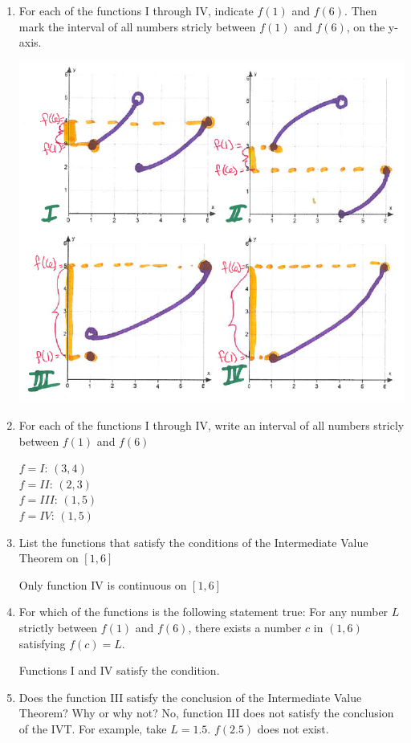 \documentclass[nooutcomes]{ximera}
\begin{document}
\begin{problem}
\begin{enumerate}
\begin{enumerate}
	\item For each of the functions I through IV, indicate $f(1)$ and $f(6)$.  Then mark the interval of all numbers stricly between $f(1)$ and $f(6)$, on the y-axis.
	\begin{image}
	\includegraphics[scale=.6]{Figure4.png}
	\end{image}


	\item For each of the functions I through IV, write an interval of all numbers stricly between $f(1)$ and $f(6)$
		\begin{freeResponse}
		$f=I$: $(3,4)$\\
		$f=II$: $(2,3)$\\
		$f=III$: $(1,5)$\\
		$f=IV$: $(1,5)$
		\end{freeResponse}
	\item List the functions that satisfy the conditions of the Intermediate Value Theorem on $[1,6]$
		\begin{freeResponse}
		Only function IV is continuous on $[1,6]$
		\end{freeResponse}
	\item For which of the functions is the following statement true: For any number $L$ strictly between $f(1)$ and $f(6)$, there exists a number $c$ in $(1,6)$ satisfying $f(c)=L$.
		\begin{freeResponse}
		Functions I and IV satisfy the condition.
		\end{freeResponse}

	\item Does the function III satisfy the conclusion of the Intermediate Value Theorem?  Why or why not?
	No, function III does not satisfy the conclusion of the IVT.  For example, take $L=1.5$.  $f(2.5)$ does not exist.
	


	\end{enumerate}
\end{enumerate}

\end{problem}
\end{document}
